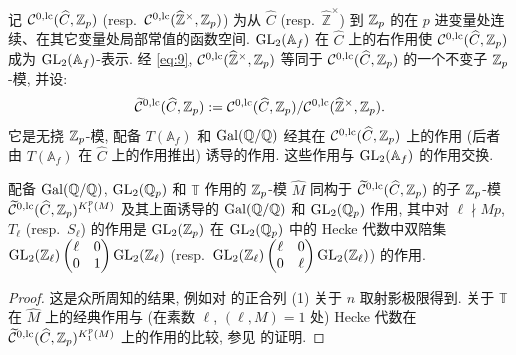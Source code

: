 记 $\mathcal{C}^{0,\mathrm{lc}}(\widehat{C},\mathbb{Z}_p)$ (resp.\ $\mathcal{C}^{0,\mathrm{lc}}(\widehat{\mathbb{Z}}^{\times},\mathbb{Z}_p)$) 为从 $\widehat{C}$ (resp.\ $\widehat{\mathbb{Z}}^{\times}$) 到 $\mathbb{Z}_p$ 的在 $p$ 进变量处连续、在其它变量处局部常值的函数空间.
$\mathrm{GL}_2(\mathbb{A}_f)$ 在 $\widehat{C}$ 上的右作用使 $\mathcal{C}^{0,\mathrm{lc}}(\widehat{C},\mathbb{Z}_p)$ 成为 $\mathrm{GL}_2(\mathbb{A}_f)$-表示.
经 \eqref{eq:9}, $\mathcal{C}^{0,\mathrm{lc}}(\widehat{\mathbb{Z}}^{\times},\mathbb{Z}_p)$ 等同于 $\mathcal{C}^{0,\mathrm{lc}}(\widehat{C},\mathbb{Z}_p)$ 的一个不变子 $\mathbb{Z}_p$-模, 并设:
\[
\widetilde{\mathcal{C}}{}^{0,\mathrm{lc}}(\widehat{C},\mathbb{Z}_p) := \mathcal{C}^{0,\mathrm{lc}}(\widehat{C},\mathbb{Z}_p)/\mathcal{C}^{0,\mathrm{lc}}(\widehat{\mathbb{Z}}^{\times},\mathbb{Z}_p).
\]
它是无挠 $\mathbb{Z}_p$-模, 配备 $T(\mathbb{A}_f)$ 和 $\operatorname{Gal}(\mathbb{Q}/\mathbb{Q})$ 经其在 $\mathcal{C}^{0,\mathrm{lc}}(\widehat{C},\mathbb{Z}_p)$ 上的作用 (后者由 $T(\mathbb{A}_f)$ 在 $\widehat{C}$ 上的作用推出) 诱导的作用.
这些作用与 $\mathrm{GL}_2(\mathbb{A}_f)$ 的作用交换.

\begin{proposition}\label{prop:3.1.1}
配备 $\operatorname{Gal}(\mathbb{Q}/\mathbb{Q})$, $\mathrm{GL}_2(\mathbb{Q}_p)$ 和 $\mathbb{T}$ 作用的 $\mathbb{Z}_p$-模 $\widehat{M}$ 同构于 $\widetilde{\mathcal{C}}{}^{0,\mathrm{lc}}(\widehat{C},\mathbb{Z}_p)$ 的子 $\mathbb{Z}_p$-模 $\widetilde{\mathcal{C}}{}^{0,\mathrm{lc}}(\widehat{C},\mathbb{Z}_p)^{K_1^{p}(M)}$ 及其上面诱导的 $\operatorname{Gal}(\mathbb{Q}/\mathbb{Q})$ 和 $\mathrm{GL}_2(\mathbb{Q}_p)$ 作用, 其中对 $\ell \nmid Mp$, $T_{\ell}$ (resp.\ $S_{\ell}$) 的作用是 $\mathrm{GL}_2(\mathbb{Z}_p)$ 在 $\mathrm{GL}_2(\mathbb{Q}_p)$ 中的 Hecke 代数中双陪集 $\mathrm{GL}_2(\mathbb{Z}_{\ell})\begin{pmatrix} \ell & 0 \\ 0 & 1 \end{pmatrix}\mathrm{GL}_2(\mathbb{Z}_{\ell})$ (resp.\ $\mathrm{GL}_2(\mathbb{Z}_{\ell})\begin{pmatrix} \ell & 0 \\ 0 & \ell \end{pmatrix}\mathrm{GL}_2(\mathbb{Z}_{\ell})$) 的作用.
\end{proposition}

\begin{proof}
这是众所周知的结果, 例如对 \cite[\S2.1]{ref:9} 的正合列 (1) 关于 $n$ 取射影极限得到.
关于 $\mathbb{T}$ 在 $\widehat{M}$ 上的经典作用与 (在素数 $\ell$, $(\ell,M) = 1$ 处) Hecke 代数在 $\widetilde{\mathcal{C}}{}^{0,\mathrm{lc}}(\widehat{C},\mathbb{Z}_p)^{K_1^{p}(M)}$ 上的作用的比较, 参见 \cite[Prop.~4.4.2]{ref:24} 的证明.
\end{proof}

